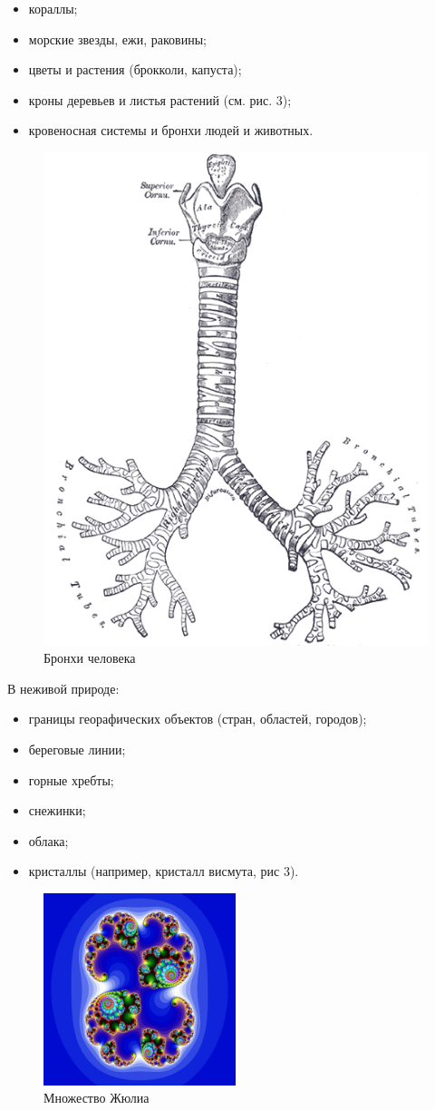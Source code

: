 \documentclass[12pt]{article}
\begin{document}
\begin{itemize}
    \item кораллы;
    \item морские звезды, ежи, раковины;
    \item цветы и растения (брокколи, капуста);
    \item кроны деревьев и листья растений (см. рис. 3);
    \item кровеносная системы и бронхи людей и животных.
\end{itemize}
\begin{figure}[h!]
    \centering
    \includegraphics[height=0.5\textwidth]{10-1-3}
    \caption{\small Бронхи человека}
\end{figure}
В неживой природе:
\begin{itemize}
    \item границы георафических объектов (стран, областей, городов);
    \item береговые линии;
    \item горные хребты;
    \item снежинки;
    \item облака;
    \item кристаллы (например, кристалл висмута, рис 3).
\end{itemize}
\begin{figure}[h!]
    \centering
    \includegraphics[width=0.5\textwidth]{10-1-2}
    \caption{\small Множество Жюлиа}
\end{figure}
\end{document}

